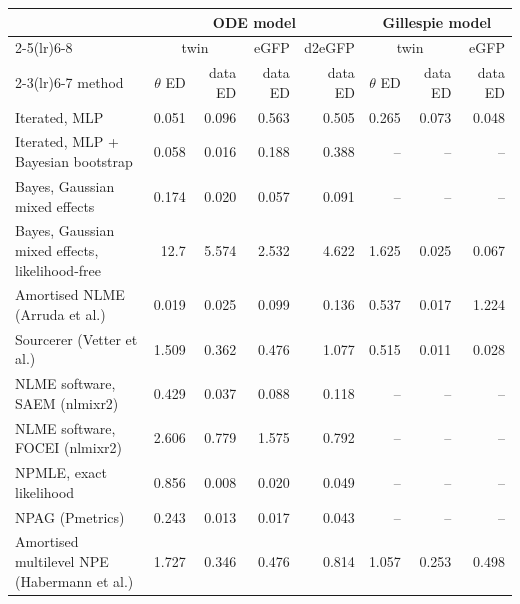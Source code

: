 \begin{tabular}{lrrrrrrr}
\toprule
 & \multicolumn{4}{c}{ODE model} & \multicolumn{3}{c}{Gillespie model} \\
\cmidrule(lr){2-5}\cmidrule(lr){6-8}
 & \multicolumn{2}{c}{twin} & eGFP & d2eGFP & \multicolumn{2}{c}{twin} & eGFP \\
\cmidrule(lr){2-3}\cmidrule(lr){6-7}
method & $\theta$ ED & data ED & data ED & data ED & $\theta$ ED & data ED & data ED \\
\midrule
Iterated, MLP & 0.051 & 0.096 & 0.563 & 0.505 & 0.265 & 0.073 & 0.048 \\
Iterated, MLP + Bayesian bootstrap & 0.058 & 0.016 & 0.188 & 0.388 & -- & -- & -- \\
Bayes, Gaussian mixed effects & 0.174 & 0.020 & 0.057 & 0.091 & -- & -- & -- \\
Bayes, Gaussian mixed effects, likelihood-free & 12.7 & 5.574 & 2.532 & 4.622 & 1.625 & 0.025 & 0.067 \\
Amortised NLME (Arruda et al.) & 0.019 & 0.025 & 0.099 & 0.136 & 0.537 & 0.017 & 1.224 \\
Sourcerer (Vetter et al.) & 1.509 & 0.362 & 0.476 & 1.077 & 0.515 & 0.011 & 0.028 \\
NLME software, SAEM (nlmixr2) & 0.429 & 0.037 & 0.088 & 0.118 & -- & -- & -- \\
NLME software, FOCEI (nlmixr2) & 2.606 & 0.779 & 1.575 & 0.792 & -- & -- & -- \\
NPMLE, exact likelihood & 0.856 & 0.008 & 0.020 & 0.049 & -- & -- & -- \\
NPAG (Pmetrics) & 0.243 & 0.013 & 0.017 & 0.043 & -- & -- & -- \\
Amortised multilevel NPE (Habermann et al.) & 1.727 & 0.346 & 0.476 & 0.814 & 1.057 & 0.253 & 0.498 \\
\bottomrule
\end{tabular}
